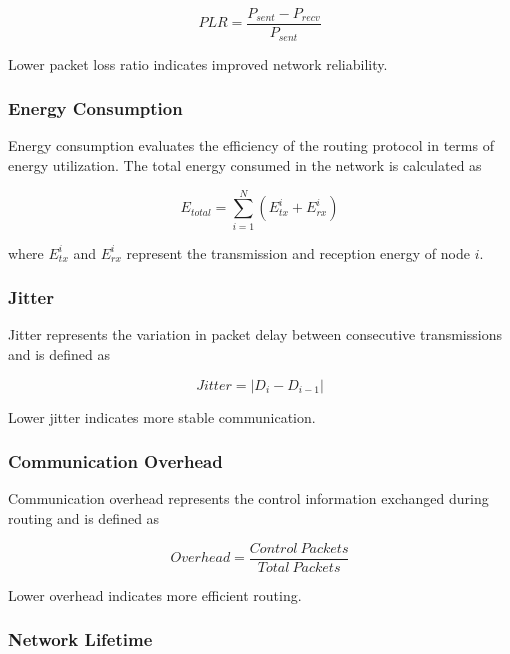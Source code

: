 \documentclass[a4paper,fleqn]{cas-dc}
\numberwithin{equation}{section}
\begin{document}
\begin{equation}
PLR = \frac{P_{sent} - P_{recv}}{P_{sent}}
\label{eq:plr_metric}
\end{equation}

Lower packet loss ratio indicates improved network reliability.

\subsubsection{Energy Consumption}

Energy consumption evaluates the efficiency of the routing protocol in terms of energy utilization. The total energy consumed in the network is calculated as

\begin{equation}
E_{total} = \sum_{i=1}^{N} (E_{tx}^i + E_{rx}^i)
\label{eq:energy_metric}
\end{equation}

where $E_{tx}^i$ and $E_{rx}^i$ represent the transmission and reception energy of node $i$.

\subsubsection{Jitter}

Jitter represents the variation in packet delay between consecutive transmissions and is defined as

\begin{equation}
Jitter = |D_i - D_{i-1}|
\label{eq:jitter_metric}
\end{equation}

Lower jitter indicates more stable communication.

\subsubsection{Communication Overhead}

Communication overhead represents the control information exchanged during routing and is defined as

\begin{equation}
Overhead = \frac{Control\ Packets}{Total\ Packets}
\label{eq:overhead_metric}
\end{equation}

Lower overhead indicates more efficient routing.

\subsubsection{Network Lifetime}
\end{document}
